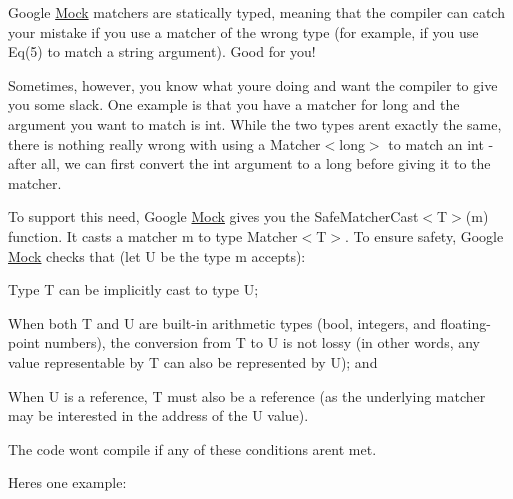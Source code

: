 Google \mbox{\hyperlink{class_mock}{Mock}} matchers are statically typed, meaning that the compiler can catch your mistake if you use a matcher of the wrong type (for example, if you use {\ttfamily Eq(5)} to match a {\ttfamily string} argument). Good for you!

Sometimes, however, you know what you\textquotesingle{}re doing and want the compiler to give you some slack. One example is that you have a matcher for {\ttfamily long} and the argument you want to match is {\ttfamily int}. While the two types aren\textquotesingle{}t exactly the same, there is nothing really wrong with using a {\ttfamily Matcher$<$long$>$} to match an {\ttfamily int} -\/ after all, we can first convert the {\ttfamily int} argument to a {\ttfamily long} before giving it to the matcher.

To support this need, Google \mbox{\hyperlink{class_mock}{Mock}} gives you the {\ttfamily Safe\+Matcher\+Cast$<$T$>$(m)} function. It casts a matcher {\ttfamily m} to type {\ttfamily Matcher$<$T$>$}. To ensure safety, Google \mbox{\hyperlink{class_mock}{Mock}} checks that (let {\ttfamily U} be the type {\ttfamily m} accepts)\+:


\begin{DoxyEnumerate}
\item Type {\ttfamily T} can be implicitly cast to type {\ttfamily U};
\end{DoxyEnumerate}
\begin{DoxyEnumerate}
\item When both {\ttfamily T} and {\ttfamily U} are built-\/in arithmetic types ({\ttfamily bool}, integers, and floating-\/point numbers), the conversion from {\ttfamily T} to {\ttfamily U} is not lossy (in other words, any value representable by {\ttfamily T} can also be represented by {\ttfamily U}); and
\end{DoxyEnumerate}
\begin{DoxyEnumerate}
\item When {\ttfamily U} is a reference, {\ttfamily T} must also be a reference (as the underlying matcher may be interested in the address of the {\ttfamily U} value).
\end{DoxyEnumerate}

The code won\textquotesingle{}t compile if any of these conditions aren\textquotesingle{}t met.

Here\textquotesingle{}s one example\+:


